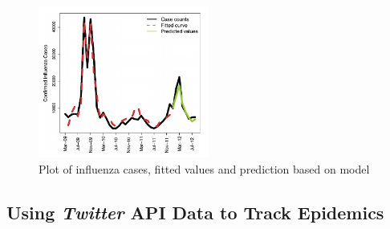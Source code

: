 \documentclass[sigconf]{acmart}
\begin{document}
\begin{figure}
  \centering
  \includegraphics[width=0.5\textwidth]{images/Figure2.pdf}
  \caption{Plot of influenza cases, fitted values and prediction based on model \cite{yuan13}} 
  \label{fig:Figure2} 
\end{figure}

\begin{table}
  \caption{Predicted values, errors, and mean absolute percent error of prediction based 
  on Baidu search queries in China for eight consecutive months (January to August 2012) 
  \cite{yuan13}}
  \label{tab:freq}
\end{table}


\subsection{Using {\itshape Twitter} API Data to Track Epidemics}
\end{document}
